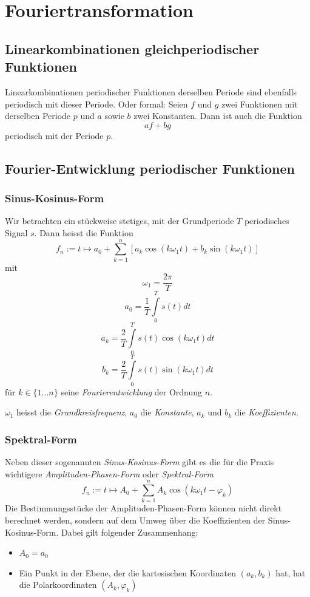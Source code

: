 \section{Fouriertransformation}


\subsection{Linearkombinationen gleichperiodischer Funktionen}

Linearkombinationen periodischer Funktionen derselben Periode sind ebenfalls
periodisch mit dieser Periode. Oder formal: Seien $f$ und $g$ zwei Funktionen
mit derselben Periode $p$ und $a$ sowie $b$ zwei Konstanten. Dann ist auch die
Funktion
$$af+bg$$
periodisch mit der Periode $p$.


\subsection{Fourier-Entwicklung periodischer Funktionen}


\subsubsection{Sinus-Kosinus-Form}
Wir betrachten ein stückweise stetiges, mit der Grundperiode $T$
periodisches Signal $s$. Dann heisst die Funktion
$$f_n := t \mapsto a_0 + \sum_{k=1}^n \left[ a_k \cos(k\omega_1t)
    + b_k\sin(k\omega_1t)\right]$$
mit
$$\omega_1 = \frac{2\pi}{T}$$
$$a_0 = \frac{1}{T} \int\limits_0^T s(t) dt$$
$$a_k = \frac{2}{T} \int\limits_0^T s(t) \cos(k\omega_1t) dt$$
$$b_k = \frac{2}{T}\int\limits_0^T s(t) \sin(k\omega_1t) dt$$
für $k \in \{1...n\}$ seine \emph{Fourierentwicklung} der Ordnung $n$.

$\omega_1$ heisst die \emph{Grundkreisfrequenz}, $a_0$ die
\emph{Konstante}, $a_k$ und $b_k$ die \emph{Koeffizienten}.

\subsubsection{Spektral-Form}
Neben dieser sogenannten \emph{Sinus-Kosinus-Form} gibt es die für die
Praxis wichtigere \emph{Amplituden-Phasen-Form} oder \emph{Spektral-Form}
$$f_n := t \mapsto A_0 + \sum_{k=1}^n A_k \cos(k\omega_1t - \varphi_k)$$
Die Bestimmungsstücke der Amplituden-Phasen-Form können nicht direkt berechnet
werden, sondern auf dem Umweg über die Koeffizienten der Sinus-Kosinus-Form.
Dabei gilt folgender Zusammenhang:
\begin{itemize}
    \item $A_0 = a_0$
    \item Ein Punkt in der Ebene, der die kartesischen Koordinaten $(a_k, b_k)$
    hat, hat die Polarkoordinaten $(A_k, \varphi_k)$
\end{itemize}


